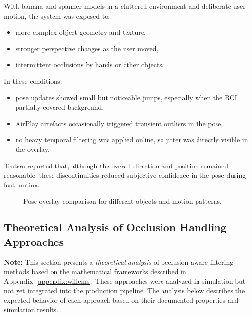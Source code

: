 With banana and spanner models in a cluttered environment and deliberate user motion, the system was exposed to:

\begin{itemize}
    \item more complex object geometry and texture,
    \item stronger perspective changes as the user moved,
    \item intermittent occlusions by hands or other objects.
\end{itemize}

In these conditions:

\begin{itemize}
    \item pose updates showed small but noticeable jumps, especially when the ROI partially covered background,
    \item AirPlay artefacts occasionally triggered transient outliers in the pose,
    \item no heavy temporal filtering was applied online, so jitter was directly visible in the overlay.
\end{itemize}

Testers reported that, although the overall direction and position remained reasonable, these discontinuities reduced subjective confidence in the pose during fast motion.

\begin{figure}[H]
    \centering
    \caption[Pose overlay comparison in different motion conditions]{Pose overlay comparison for different objects and motion patterns.}
    \label{fig:poseoverlay}
\end{figure}

\subsection{Theoretical Analysis of Occlusion Handling Approaches}

\textbf{Note:} This section presents a \emph{theoretical analysis} of occlusion-aware filtering methods based on the mathematical frameworks described in Appendix~\ref{appendix:willems}. These approaches were analyzed in simulation but not yet integrated into the production pipeline. The analysis below describes the expected behavior of each approach based on their documented properties and simulation results.

